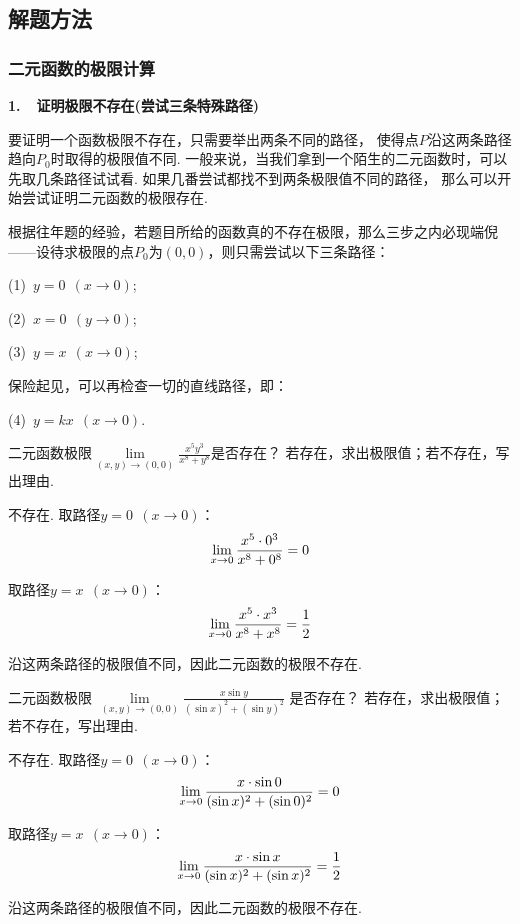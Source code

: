 \subsection{解题方法}

\subsubsection{二元函数的极限计算}

\textbf{1.~~证明极限不存在(尝试三条特殊路径)} \vspace{0.25em}

要证明一个函数极限不存在，只需要举出两条不同的路径，
使得点$P$沿这两条路径趋向$P_0$时取得的极限值不同.
一般来说，当我们拿到一个陌生的二元函数时，可以先取几条路径试试看.
如果几番尝试都找不到两条极限值不同的路径，
那么可以开始尝试证明二元函数的极限存在.

根据往年题的经验，若题目所给的函数真的不存在极限，那么三步之内必现端倪——设待求极限的点$P_0$为$(0,0)$，则只需尝试以下三条路径：\par
(1)~$y = 0 ~~(x \to 0)$;\par
(2)~$x = 0 ~~(y \to 0)$;\par
(3)~$y = x~~(x \to 0)$;\par
保险起见，可以再检查一切的直线路径，即：\par
(4)~$y = kx~~(x \to 0)$.

\begin{example}[2020]
\label{ex:ch06-01}
二元函数极限$\lim\limits_{\scriptscriptstyle{(x,y)\to (0,0)} }\frac{x^5y^3}{x^8+y^8}$是否存在？
若存在，求出极限值；若不存在，写出理由.
\end{example}

\begin{solution}
不存在. 取路径$y = 0 ~~(x \to 0)$：
$$
\limx0 \frac{x^5 \cdot 0^3}{x^8+0^8} = 0
$$\par
取路径$y = x~~(x \to 0)$：
$$
\limx0 \frac{x^5 \cdot x^3}{x^8 + x^8} = \frac{1}{2}
$$\par
沿这两条路径的极限值不同，因此二元函数的极限不存在.
\end{solution}

\begin{example}[2022 A卷]
\label{ex:ch06-02}
二元函数极限
$\lim\limits_{\scriptscriptstyle{(x,y)\to (0,0)} }\frac{x \sin y}{(\sin x)^2 + (\sin y)^2}$
是否存在？
若存在，求出极限值；若不存在，写出理由.
\end{example}

\begin{solution}
不存在. 取路径$y = 0 ~~(x \to 0)$：
$$
\limx0 \frac{x \cdot \sin 0}{(\sin x)^2+ (\sin 0)^2} = 0
$$\par
取路径$y = x~~(x \to 0)$：
$$
\limx0 \frac{x \cdot \sin x}{(\sin x)^2 + (\sin x)^2} = \frac{1}{2}
$$

沿这两条路径的极限值不同，因此二元函数的极限不存在.
\end{solution}

